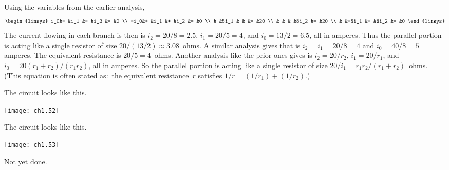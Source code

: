 \begin{ans}{2}
      \begin{exparts}
        \partsitem
          Using the variables from the earlier analysis,
          \begin{displaymath}
            \begin{linsys}{3}
              i_0&- &i_1    &-  &i_2   &=  &0 \\
             -i_0&+ &i_1    &+  &i_2   &=  &0  \\
                 &  &5i_1   &   &      &=  &20  \\
                 &  &       &   &8i_2  &=  &20  \\
                 &  &-5i_1  &+  &8i_2  &=  &0
            \end{linsys}
          \end{displaymath}
          The current flowing in each branch is then
          is $i_2=20/8=2.5$, $i_1=20/5=4$, and $i_0=13/2=6.5$, all in amperes.
          Thus the parallel portion is acting like a single resistor
          of size $20/(13/2)\approx 3.08$~ohms.
        \partsitem
          A similar analysis gives that
          is $i_2=i_1=20/8=4$ and $i_0=40/8=5$~ amperes.
          The equivalent resistance is $20/5=4$~ohms.
        \partsitem
          Another analysis like the prior ones gives
          is $i_2=20/r_2$, $i_1=20/r_1$,
          and $i_0=20(r_1+r_2)/(r_1r_2)$, all in amperes.
          So the parallel portion is acting like a single resistor of
          size $20/i_1=r_1r_2/(r_1+r_2)$~ohms.
          (This equation is often stated as:~the equivalent
          resistance~$r$ satisfies $1/r=(1/r_1)+(1/r_2)$.)
      \end{exparts}
    
\end{ans}
\begin{ans}{3}
      \begin{exparts}
        \partsitem The circuit looks like this.
          \begin{center}
            \texttt{[image: ch1.52]}
          \end{center}
        \partsitem The circuit looks like this.
          \begin{center}
            \texttt{[image: ch1.53]}
          \end{center}
      \end{exparts}
    
\end{ans}
\begin{ans}{4}
     Not yet done.
   
\end{ans}
